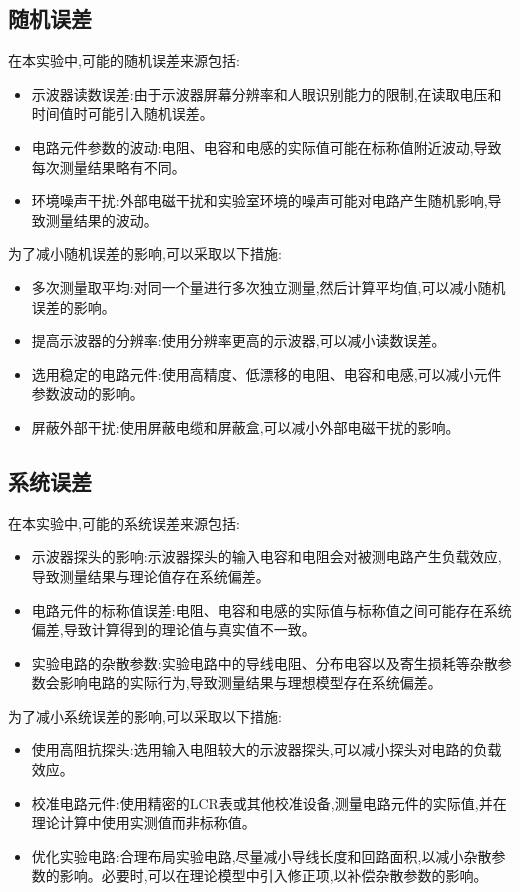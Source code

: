 \documentclass[UTF8]{ctexart}
\begin{document}
\subsection{随机误差}

在本实验中,可能的随机误差来源包括:

\begin{itemize}
    \item 示波器读数误差:由于示波器屏幕分辨率和人眼识别能力的限制,在读取电压和时间值时可能引入随机误差。
    \item 电路元件参数的波动:电阻、电容和电感的实际值可能在标称值附近波动,导致每次测量结果略有不同。
    \item 环境噪声干扰:外部电磁干扰和实验室环境的噪声可能对电路产生随机影响,导致测量结果的波动。
\end{itemize}

为了减小随机误差的影响,可以采取以下措施:
\begin{itemize}
    \item 多次测量取平均:对同一个量进行多次独立测量,然后计算平均值,可以减小随机误差的影响。
    \item 提高示波器的分辨率:使用分辨率更高的示波器,可以减小读数误差。
    \item 选用稳定的电路元件:使用高精度、低漂移的电阻、电容和电感,可以减小元件参数波动的影响。
    \item 屏蔽外部干扰:使用屏蔽电缆和屏蔽盒,可以减小外部电磁干扰的影响。
\end{itemize}

\subsection{系统误差}

在本实验中,可能的系统误差来源包括:

\begin{itemize}
    \item 示波器探头的影响:示波器探头的输入电容和电阻会对被测电路产生负载效应,导致测量结果与理论值存在系统偏差。
    \item 电路元件的标称值误差:电阻、电容和电感的实际值与标称值之间可能存在系统偏差,导致计算得到的理论值与真实值不一致。
    \item 实验电路的杂散参数:实验电路中的导线电阻、分布电容以及寄生损耗等杂散参数会影响电路的实际行为,导致测量结果与理想模型存在系统偏差。
\end{itemize}

为了减小系统误差的影响,可以采取以下措施:
\begin{itemize}
    \item 使用高阻抗探头:选用输入电阻较大的示波器探头,可以减小探头对电路的负载效应。
    \item 校准电路元件:使用精密的LCR表或其他校准设备,测量电路元件的实际值,并在理论计算中使用实测值而非标称值。
    \item 优化实验电路:合理布局实验电路,尽量减小导线长度和回路面积,以减小杂散参数的影响。必要时,可以在理论模型中引入修正项,以补偿杂散参数的影响。
\end{itemize}
\end{document}
